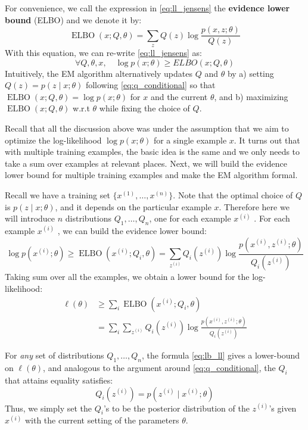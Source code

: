 For convenience, we call the expression in \cref{eq:ll_jensens} the \textbf{evidence
lower bound} (ELBO) and we denote it by:
\begin{equation}
    \operatorname{ELBO}(x;Q,\theta) = \sum_z Q(z) \log \frac{p(x,z;\theta)}{Q(z)}\label{eq:elbo}
\end{equation}
With this equation, we can re-write \cref{eq:ll_jensens} as:
\begin{equation}
    \forall Q,\theta,x, \quad \log p(x;\theta) \ge ELBO(x;Q,\theta)\label{eq:forall_elbo}
\end{equation}
Intuitively, the EM algorithm alternatively updates $Q$ and $\theta$ by a) setting
$Q(z) = p(z \mid x;\theta)$ following \cref{eq:q_conditional} so that $\operatorname{ELBO}(x;Q,\theta) = \log p(x;\theta)$
for $x$ and the current $\theta$, and b) maximizing $\operatorname{ELBO}(x;Q,\theta)$ w.r.t $\theta$ while fixing
the choice of $Q$.

Recall that all the discussion above was under the assumption that we
aim to optimize the log-likelihood $\log p(x;\theta)$ for a single example $x$. It turns
out that with multiple training examples, the basic idea is the same and we
only needs to take a sum over examples at relevant places. Next, we will
build the evidence lower bound for multiple training examples and make the
EM algorithm formal.

Recall we have a training set $\{x^{(1)} ,\ldots,x^{(n)} \}$. Note that the optimal choice
of $Q$ is $p(z \mid x;\theta)$, and it depends on the particular example $x$. Therefore here
we will introduce $n$ distributions $Q_1,\ldots,Q_n$, one for each example $x^{(i)}$ . For
each example $x^{(i)}$ , we can build the evidence lower bound:
\begin{equation*}
    \log p(x^{(i)} ;\theta) \ge \operatorname{ELBO}(x^{(i)} ;Q_i ,\theta) = \sum_{z^{(i)}} Q_i(z^{(i)})\log\frac{p(x^{(i)},z^{(i)} ;\theta)}{Q_i (z^{(i)})}
\end{equation*}
Taking sum over all the examples, we obtain a lower bound for the log-
likelihood:
\begin{align}
    \ell(\theta) &\ge \sum_{i} \operatorname{ELBO}(x^{(i)} ;Q_i ,\theta)\label{eq:lb_ll}\\
        &= \sum_{i} \sum_{z^{(i)}} Q_i(z^{(i)}) \log \frac{p(x^{(i)} ,z^{(i)} ;\theta)}{Q_i(z^{(i)})}    
\end{align}

For \textit{any} set of distributions $Q_1 ,\ldots,Q_n$, the formula \ref{eq:lb_ll} gives a
lower-bound on $\ell(\theta)$, and analogous to the argument around \cref{eq:q_conditional}, the $Q_i$
that attains equality satisfies:
\begin{equation*}
    Q_i(z^{(i)}) = p(z^{(i)} \mid x^{(i)} ;\theta)
\end{equation*}
Thus, we simply set the $Q_i$'s to be the posterior distribution of the $z^{(i)}$'s
given $x^{(i)}$ with the current setting of the parameters $\theta$.


